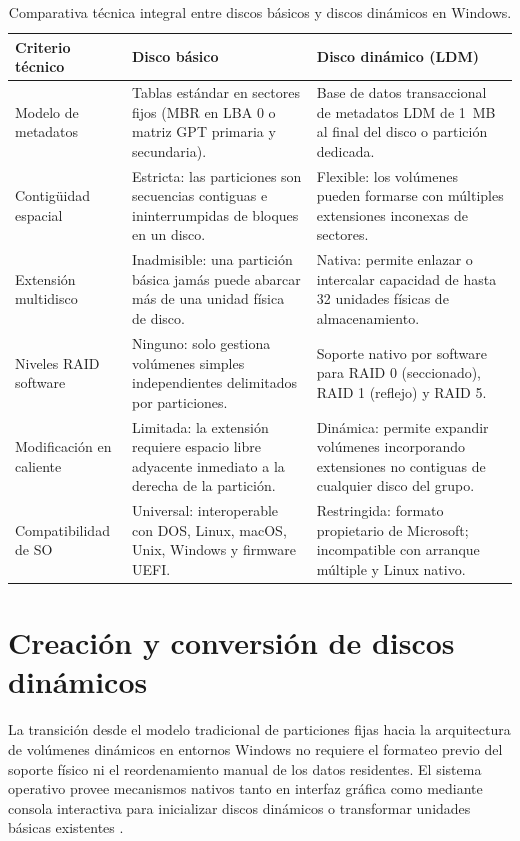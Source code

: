 \documentclass[12pt]{article}
\begin{document}
\begin{table}[!t]
\centering
\small
\renewcommand{\arraystretch}{1.1}
\renewcommand{\tabularxcolumn}[1]{m{#1}}
\setlength{\emergencystretch}{1.5em}
\caption{Comparativa técnica integral entre discos básicos y discos dinámicos en Windows.}
\label{tab:comparativaBasicosDinamicos}
\begin{tabularx}{\textwidth}{>{\centering\arraybackslash}m{2.6cm} X X}
\toprule
\textbf{Criterio técnico} & \textbf{Disco básico} & \textbf{Disco dinámico (LDM)} \\
\midrule
Modelo de metadatos & Tablas estándar en sectores fijos (MBR en LBA 0 o matriz GPT primaria y secundaria). & Base de datos transaccional de metadatos LDM de 1~MB al final del disco o partición dedicada. \\
\addlinespace
Contigüidad espacial & Estricta: las particiones son secuencias contiguas e ininterrumpidas de bloques en un disco. & Flexible: los volúmenes pueden formarse con múltiples extensiones inconexas de sectores. \\
\addlinespace
Extensión multidisco & Inadmisible: una partición básica jamás puede abarcar más de una unidad física de disco. & Nativa: permite enlazar o intercalar capacidad de hasta 32 unidades físicas de almacenamiento. \\
\addlinespace
Niveles RAID software & Ninguno: solo gestiona volúmenes simples independientes delimitados por particiones. & Soporte nativo por software para RAID 0 (seccionado), RAID 1 (reflejo) y RAID 5. \\
\addlinespace
Modificación en caliente & Limitada: la extensión requiere espacio libre adyacente inmediato a la derecha de la partición. & Dinámica: permite expandir volúmenes incorporando extensiones no contiguas de cualquier disco del grupo. \\
\addlinespace
Compatibilidad de SO & Universal: interoperable con DOS, Linux, macOS, Unix, Windows y firmware UEFI. & Restringida: formato propietario de Microsoft; incompatible con arranque múltiple y Linux nativo. \\
\bottomrule
\end{tabularx}
\end{table}

\section{Creación y conversión de discos dinámicos}
\label{sec:creacionConversionDinamicos}

La transición desde el modelo tradicional de particiones fijas hacia la arquitectura de volúmenes dinámicos en entornos Windows no requiere el formateo previo del soporte físico ni el reordenamiento manual de los datos residentes. El sistema operativo provee mecanismos nativos tanto en interfaz gráfica como mediante consola interactiva para inicializar discos dinámicos o transformar unidades básicas existentes \parencite{microsoft2024basicdynamic}.
\end{document}
